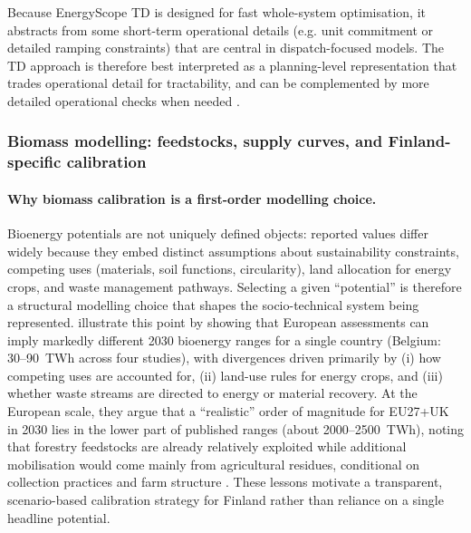 \documentclass{article}
\begin{document}
Because EnergyScope TD is designed for fast whole-system optimisation, it abstracts from some short-term operational details (e.g. unit commitment or detailed ramping constraints) that are central in dispatch-focused models. The TD approach is therefore best interpreted as a planning-level representation that trades operational detail for tractability, and can be complemented by more detailed operational checks when needed \citep{thiran_exploring_2025}.


\subsubsection{Biomass modelling: feedstocks, supply curves, and Finland-specific calibration}
\label{sec:biomass_modelling}

\paragraph{Why biomass calibration is a first-order modelling choice.}
Bioenergy potentials are not uniquely defined objects: reported values differ widely because they embed distinct assumptions about sustainability constraints, competing uses (materials, soil functions, circularity), land allocation for energy crops, and waste management pathways. Selecting a given ``potential'' is therefore a structural modelling choice that shapes the socio-technical system being represented. \citet{colla_navigating_2024} illustrate this point by showing that European assessments can imply markedly different 2030 bioenergy ranges for a single country (Belgium: 30--90~TWh across four studies), with divergences driven primarily by (i) how competing uses are accounted for, (ii) land-use rules for energy crops, and (iii) whether waste streams are directed to energy or material recovery. At the European scale, they argue that a ``realistic'' order of magnitude for EU27+UK in 2030 lies in the lower part of published ranges (about 2000--2500~TWh), noting that forestry feedstocks are already relatively exploited while additional mobilisation would come mainly from agricultural residues, conditional on collection practices and farm structure \citep{colla_navigating_2024}. These lessons motivate a transparent, scenario-based calibration strategy for Finland rather than reliance on a single headline potential.
\end{document}
